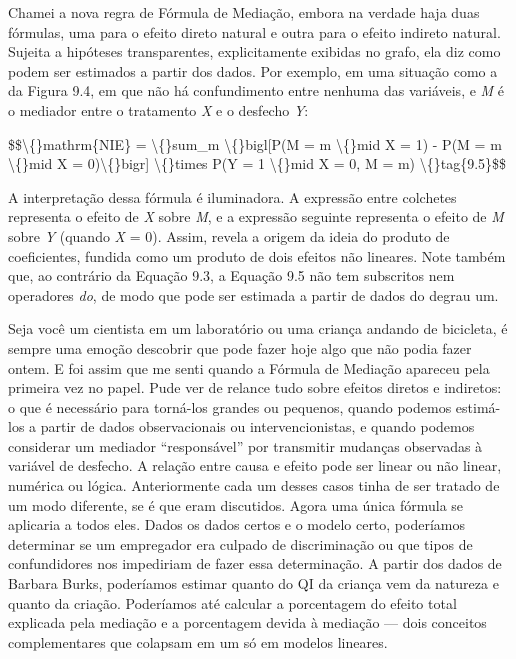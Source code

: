 \documentclass[11pt,a5paper,twoside]{book}
\begin{document}
Chamei a nova regra de Fórmula de Mediação, embora na verdade haja duas fórmulas, uma para o efeito direto natural e outra para o efeito indireto natural. Sujeita a hipóteses transparentes, explicitamente exibidas no grafo, ela diz como podem ser estimados a partir dos dados. Por exemplo, em uma situação como a da Figura 9.4, em que não há confundimento entre nenhuma das variáveis, e \textit{M} é o mediador entre o tratamento \textit{X} e o desfecho \textit{Y}:

\$\$\textbackslash\{\}mathrm\{NIE\} = \textbackslash\{\}sum\_m \textbackslash\{\}bigl[P(M = m \textbackslash\{\}mid X = 1) - P(M = m \textbackslash\{\}mid X = 0)\textbackslash\{\}bigr] \textbackslash\{\}times P(Y = 1 \textbackslash\{\}mid X = 0, M = m) \textbackslash\{\}tag\{9.5\}\$\$

A interpretação dessa fórmula é iluminadora. A expressão entre colchetes representa o efeito de \textit{X} sobre \textit{M}, e a expressão seguinte representa o efeito de \textit{M} sobre \textit{Y} (quando \textit{X} = 0). Assim, revela a origem da ideia do produto de coeficientes, fundida como um produto de dois efeitos não lineares. Note também que, ao contrário da Equação 9.3, a Equação 9.5 não tem subscritos nem operadores \textit{do}, de modo que pode ser estimada a partir de dados do degrau um.

Seja você um cientista em um laboratório ou uma criança andando de bicicleta, é sempre uma emoção descobrir que pode fazer hoje algo que não podia fazer ontem. E foi assim que me senti quando a Fórmula de Mediação apareceu pela primeira vez no papel. Pude ver de relance tudo sobre efeitos diretos e indiretos: o que é necessário para torná-los grandes ou pequenos, quando podemos estimá-los a partir de dados observacionais ou intervencionistas, e quando podemos considerar um mediador “responsável” por transmitir mudanças observadas à variável de desfecho. A relação entre causa e efeito pode ser linear ou não linear, numérica ou lógica. Anteriormente cada um desses casos tinha de ser tratado de um modo diferente, se é que eram discutidos. Agora uma única fórmula se aplicaria a todos eles. Dados os dados certos e o modelo certo, poderíamos determinar se um empregador era culpado de discriminação ou que tipos de confundidores nos impediriam de fazer essa determinação. A partir dos dados de Barbara Burks, poderíamos estimar quanto do QI da criança vem da natureza e quanto da criação. Poderíamos até calcular a porcentagem do efeito total explicada pela mediação e a porcentagem devida à mediação — dois conceitos complementares que colapsam em um só em modelos lineares.
\end{document}
